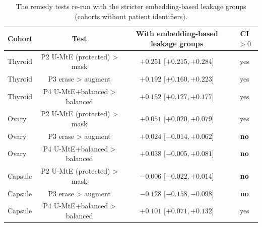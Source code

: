 \begin{table}[H]\centering\scriptsize
\caption{The remedy tests re-run with the stricter embedding-based leakage groups (cohorts without patient identifiers).}\label{tab:embrem}
\begin{tabular}{lccc}\toprule
Cohort & Test & With embedding-based leakage groups & CI $>0$ \\\midrule
Thyroid & P2 U-MtE (protected) > mask & $+0.251$ [$+0.215, +0.284$] & yes \\
Thyroid & P3 erase > augment & $+0.192$ [$+0.160, +0.223$] & yes \\
Thyroid & P4 U-MtE+balanced > balanced & $+0.152$ [$+0.127, +0.177$] & yes \\
Ovary & P2 U-MtE (protected) > mask & $+0.051$ [$+0.020, +0.079$] & yes \\
Ovary & P3 erase > augment & $+0.024$ [$-0.014, +0.062$] & \textbf{no} \\
Ovary & P4 U-MtE+balanced > balanced & $+0.038$ [$-0.005, +0.081$] & \textbf{no} \\
Capsule & P2 U-MtE (protected) > mask & $-0.006$ [$-0.022, +0.014$] & \textbf{no} \\
Capsule & P3 erase > augment & $-0.128$ [$-0.158, -0.098$] & \textbf{no} \\
Capsule & P4 U-MtE+balanced > balanced & $+0.101$ [$+0.071, +0.132$] & yes \\
\bottomrule\end{tabular}
\end{table}
